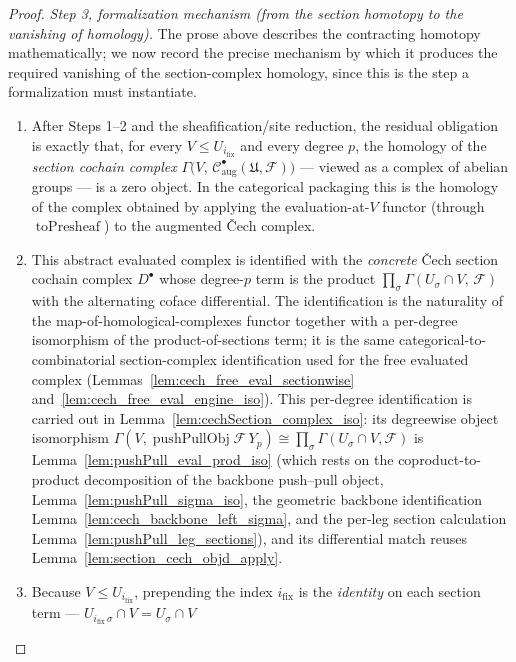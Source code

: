 \begin{proof}
  \emph{Step 3, formalization mechanism (from the section homotopy to the vanishing of homology).} The prose
  above describes the contracting homotopy mathematically; we now record the precise mechanism by which it
  produces the required vanishing of the section-complex homology, since this is the step a formalization
  must instantiate.
  \begin{enumerate}
    \item[(a)] After Steps 1--2 and the sheafification/site reduction, the residual obligation is exactly
      that, for every \(V \le U_{i_{\mathrm{fix}}}\) and every degree \(p\), the homology of the
      \emph{section cochain complex} \(\Gamma\bigl(V,\, \mathcal{C}^\bullet_{\mathrm{aug}}(\mathfrak{U},
      \mathcal{F})\bigr)\) --- viewed as a complex of abelian groups --- is a zero object. In the categorical
      packaging this is the homology of the complex obtained by applying the evaluation-at-\(V\) functor
      (through \(\operatorname{toPresheaf}\)) to the augmented {\v C}ech complex.
    \item[(b)] This abstract evaluated complex is identified with the \emph{concrete} {\v C}ech section
      cochain complex \(D^\bullet\) whose degree-\(p\) term is the product
      \(\prod_{\sigma} \Gamma(U_\sigma \cap V,\, \mathcal{F})\) with the alternating coface differential. The
      identification is the naturality of the map-of-homological-complexes functor together with a
      per-degree isomorphism of the product-of-sections term; it is the same
      categorical-to-combinatorial section-complex identification used for the free evaluated complex
      (Lemmas~\ref{lem:cech_free_eval_sectionwise} and~\ref{lem:cech_free_eval_engine_iso}). This per-degree
      identification is carried out in
      Lemma~\ref{lem:cechSection_complex_iso}: its degreewise object isomorphism
      \(\Gamma(V, \operatorname{pushPullObj}\mathcal{F}\,Y_p) \cong \prod_\sigma \Gamma(U_\sigma \cap V,
      \mathcal{F})\) is Lemma~\ref{lem:pushPull_eval_prod_iso} (which rests on the coproduct-to-product
      decomposition of the backbone push--pull object, Lemma~\ref{lem:pushPull_sigma_iso}, the geometric
      backbone identification Lemma~\ref{lem:cech_backbone_left_sigma}, and the per-leg section calculation
      Lemma~\ref{lem:pushPull_leg_sections}), and its differential match reuses
      Lemma~\ref{lem:section_cech_objd_apply}.
    \item[(c)] Because \(V \le U_{i_{\mathrm{fix}}}\), prepending the index \(i_{\mathrm{fix}}\) is the
      \emph{identity} on each section term --- \(U_{i_{\mathrm{fix}}\,\sigma} \cap V = U_\sigma \cap V\)

\end{enumerate}
\end{proof}

